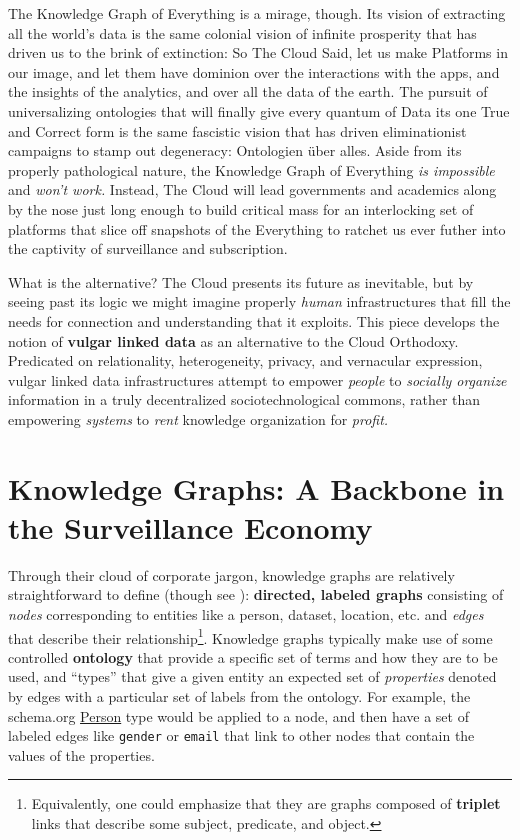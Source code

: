 The Knowledge Graph of Everything is a mirage, though. Its vision of
extracting all the world's data is the same colonial vision of infinite
prosperity that has driven us to the brink of extinction: So The Cloud
Said, let us make Platforms in our image, and let them have dominion
over the interactions with the apps, and the insights of the analytics,
and over all the data of the earth. The pursuit of universalizing
ontologies that will finally give every quantum of Data its one True and
Correct form is the same fascistic vision that has driven eliminationist
campaigns to stamp out degeneracy: Ontologien über alles. Aside from its
properly pathological nature, the Knowledge Graph of Everything \emph{is
impossible} and \emph{won't work.} Instead, The Cloud will lead
governments and academics along by the nose just long enough to build
critical mass for an interlocking set of platforms that slice off
snapshots of the Everything to ratchet us ever futher into the captivity
of surveillance and subscription.

What is the alternative? The Cloud presents its future as inevitable,
but by seeing past its logic we might imagine properly \emph{human}
infrastructures that fill the needs for connection and understanding
that it exploits. This piece develops the notion of \textbf{vulgar
linked data} as an alternative to the Cloud Orthodoxy. Predicated on
relationality, heterogeneity, privacy, and vernacular expression, vulgar
linked data infrastructures attempt to empower \emph{people} to
\emph{socially organize} information in a truly decentralized
sociotechnological commons, rather than empowering \emph{systems} to
\emph{rent} knowledge organization for \emph{profit.}

\hypertarget{knowledge-graphs-a-backbone-in-the-surveillance-economy}{%
\section{Knowledge Graphs: A Backbone in the Surveillance
Economy}\label{knowledge-graphs-a-backbone-in-the-surveillance-economy}}

Through their cloud of corporate jargon, knowledge graphs are relatively
straightforward to define \cite{chaudhriKnowledgeGraphsIntroduction2022, hitzlerReviewSemanticWeb2021, yanRetrospectiveKnowledgeGraphs2018, bergmanCommonSenseView2019} 
(though see \cite{ehrlingerDefinitionKnowledgeGraphs2016} ):
\textbf{directed, labeled graphs} consisting of \emph{nodes}
corresponding to entities like a person, dataset, location, etc. and
\emph{edges} that describe their relationship\footnote{Equivalently, one
  could emphasize that they are graphs composed of \textbf{triplet}
  links that describe some subject, predicate, and object.}. Knowledge
graphs typically make use of some controlled \textbf{ontology} that
provide a specific set of terms and how they are to be used, and
``types'' that give a given entity an expected set of \emph{properties}
denoted by edges with a particular set of labels from the ontology. For
example, the schema.org \href{https://schema.org/Person}{Person} type
would be applied to a node, and then have a set of labeled edges like
\texttt{gender} or \texttt{email} that link to other nodes that contain
the values of the properties.


